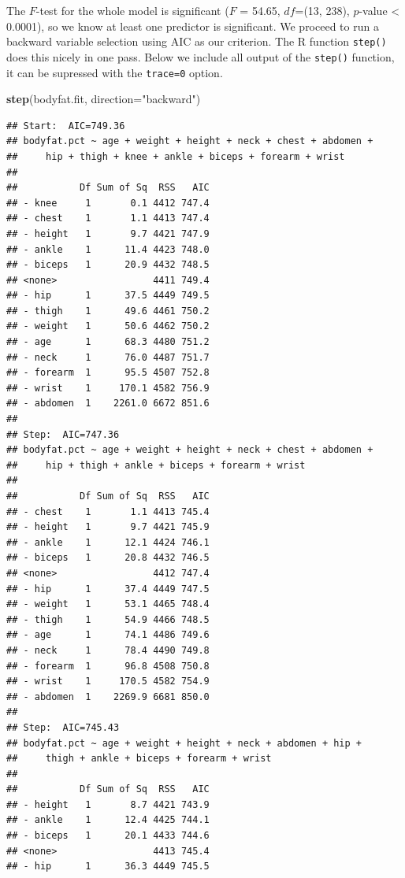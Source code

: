 \documentclass[
]{book}
\newenvironment{Shaded}{\begin{snugshade}}{\end{snugshade}}
\newcommand{\AttributeTok}[1]{\textcolor[rgb]{0.13,0.29,0.53}{#1}}
\newcommand{\FunctionTok}[1]{\textcolor[rgb]{0.13,0.29,0.53}{\textbf{#1}}}
\newcommand{\NormalTok}[1]{#1}
\newcommand{\StringTok}[1]{\textcolor[rgb]{0.31,0.60,0.02}{#1}}
\begin{document}
The \(F\)-test for the whole model is significant (\(F\) = 54.65, \(df\)=(13, 238), \(p\)-value \textless{} 0.0001), so we know at least one predictor is significant. We proceed to run a backward variable selection using AIC as our criterion. The R function \texttt{step()} does this nicely in one pass. Below we include all output of the \texttt{step()} function, it can be supressed with the \texttt{trace=0} option.

\begin{Shaded}
\begin{Highlighting}[]
\FunctionTok{step}\NormalTok{(bodyfat.fit, }\AttributeTok{direction=}\StringTok{"backward"}\NormalTok{)}
\end{Highlighting}
\end{Shaded}

\begin{verbatim}
## Start:  AIC=749.36
## bodyfat.pct ~ age + weight + height + neck + chest + abdomen + 
##     hip + thigh + knee + ankle + biceps + forearm + wrist
## 
##           Df Sum of Sq  RSS   AIC
## - knee     1       0.1 4412 747.4
## - chest    1       1.1 4413 747.4
## - height   1       9.7 4421 747.9
## - ankle    1      11.4 4423 748.0
## - biceps   1      20.9 4432 748.5
## <none>                 4411 749.4
## - hip      1      37.5 4449 749.5
## - thigh    1      49.6 4461 750.2
## - weight   1      50.6 4462 750.2
## - age      1      68.3 4480 751.2
## - neck     1      76.0 4487 751.7
## - forearm  1      95.5 4507 752.8
## - wrist    1     170.1 4582 756.9
## - abdomen  1    2261.0 6672 851.6
## 
## Step:  AIC=747.36
## bodyfat.pct ~ age + weight + height + neck + chest + abdomen + 
##     hip + thigh + ankle + biceps + forearm + wrist
## 
##           Df Sum of Sq  RSS   AIC
## - chest    1       1.1 4413 745.4
## - height   1       9.7 4421 745.9
## - ankle    1      12.1 4424 746.1
## - biceps   1      20.8 4432 746.5
## <none>                 4412 747.4
## - hip      1      37.4 4449 747.5
## - weight   1      53.1 4465 748.4
## - thigh    1      54.9 4466 748.5
## - age      1      74.1 4486 749.6
## - neck     1      78.4 4490 749.8
## - forearm  1      96.8 4508 750.8
## - wrist    1     170.5 4582 754.9
## - abdomen  1    2269.9 6681 850.0
## 
## Step:  AIC=745.43
## bodyfat.pct ~ age + weight + height + neck + abdomen + hip + 
##     thigh + ankle + biceps + forearm + wrist
## 
##           Df Sum of Sq  RSS   AIC
## - height   1       8.7 4421 743.9
## - ankle    1      12.4 4425 744.1
## - biceps   1      20.1 4433 744.6
## <none>                 4413 745.4
## - hip      1      36.3 4449 745.5

\end{verbatim}
\end{document}
